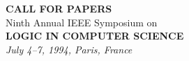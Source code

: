 
\topmargin-0.75in





\marginparwidth 0pt \oddsidemargin  0pt \evensidemargin  0pt
\marginparsep 0pt
\textwidth 6.5in \textheight 10.0in\parskip 6pt \parindent 0pt
\renewcommand{\i}[1]{{\it #1 \/}}

\thispagestyle{empty}

\begin{center}
{\bf CALL FOR PAPERS}\\[2ex]
{\large Ninth Annual IEEE Symposium on }\\[2ex]
{\Large\bf LOGIC IN COMPUTER SCIENCE }\\[2ex]
{\large\it July 4--7, 1994, Paris, France}
\end{center}
\vspace{.2in}
\small
